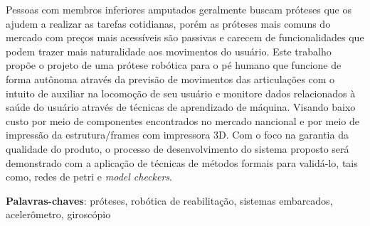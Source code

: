 \documentclass[
    12pt,       %
    oneside,    %
    a4paper,    %
%
    chapter=TITLE,	  	  %
%
    english,			  %
    brazil				  %
%
]{abntex2}
\begin{document}
\setlength{\absparsep}{18pt} %

\begin{resumo}[Resumo]
  Pessoas com membros inferiores amputados geralmente buscam próteses que os ajudem a realizar as tarefas cotidianas, porém as próteses mais comuns do mercado com preços mais acessíveis são passivas e carecem de funcionalidades que podem trazer mais naturalidade aos movimentos do usuário. Este trabalho propõe o projeto de uma prótese robótica para o pé humano que funcione de forma autônoma através da previsão de movimentos das articulações com o intuito de auxiliar na locomoção de seu usuário e monitore dados relacionados à saúde do usuário através de técnicas de aprendizado de máquina. Visando baixo custo por meio de componentes encontrados no mercado nancional e por meio de impressão da estrutura/frames com impressora 3D. Com o foco na garantia da qualidade do produto, o processo de desenvolvimento do sistema proposto será demonstrado com a aplicação de técnicas de métodos formais para validá-lo, tais como, redes de petri e \textit{model checkers}.

 \vspace{\onelineskip}

 \noindent
 \textbf{Palavras-chaves}: próteses, robótica de reabilitação, sistemas embarcados, acelerômetro, giroscópio
\end{resumo}


%   
% 
\end{document}

